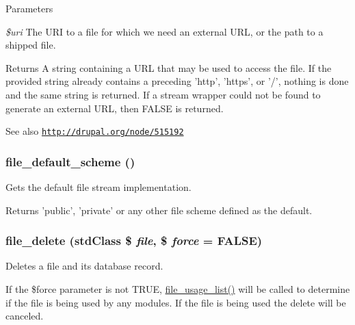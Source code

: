 \begin{DoxyParams}{Parameters}
\item[{\em \$uri}]The URI to a file for which we need an external URL, or the path to a shipped file.\end{DoxyParams}
\begin{DoxyReturn}{Returns}
A string containing a URL that may be used to access the file. If the provided string already contains a preceding 'http', 'https', or '/', nothing is done and the same string is returned. If a stream wrapper could not be found to generate an external URL, then FALSE is returned.
\end{DoxyReturn}
\begin{DoxySeeAlso}{See also}
\href{http://drupal.org/node/515192}{\tt http://drupal.org/node/515192} 
\end{DoxySeeAlso}
\hypertarget{group__file_ga360bf8899ace3c977d257510651a763d}{
\subsubsection[{file\_\-default\_\-scheme}]{\setlength{\rightskip}{0pt plus 5cm}file\_\-default\_\-scheme ()}}
\label{group__file_ga360bf8899ace3c977d257510651a763d}
Gets the default file stream implementation.

\begin{DoxyReturn}{Returns}
'public', 'private' or any other file scheme defined as the default. 
\end{DoxyReturn}
\hypertarget{group__file_gac7503f0dcdea965d68e4a242e7760921}{
\subsubsection[{file\_\-delete}]{\setlength{\rightskip}{0pt plus 5cm}file\_\-delete (stdClass \$ {\em file}, \/  \$ {\em force} = {\ttfamily FALSE})}}
\label{group__file_gac7503f0dcdea965d68e4a242e7760921}
Deletes a file and its database record.

If the \$force parameter is not TRUE, \hyperlink{group__file_ga6399c4096559ffbe81cfcb22db782bc4}{file\_\-usage\_\-list()} will be called to determine if the file is being used by any modules. If the file is being used the delete will be canceled.


